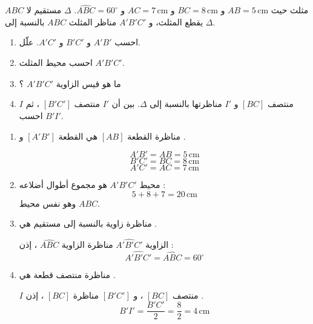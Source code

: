 \documentclass[12pt,a4paper]{article}
\newcommand{\cm}{\,\mathrm{cm}}
\begin{document}
\begin{corr}[title={الحفاظ على الأطوال والزوايا}, stars=2, source={Axiomaths}]
$ABC$ مثلث حيث $AB=5\cm$ و $BC=8\cm$ و $AC=7\cm$ و $\widehat{ABC}=60^\circ$. $\Delta$ مستقيم لا يقطع المثلث، و $A'B'C'$ مناظر المثلث $ABC$ بالنسبة إلى $\Delta$.
\begin{enumerate}
  \item احسب $A'B'$ و $B'C'$ و $A'C'$. علّل.
  \item احسب محيط المثلث $A'B'C'$.
  \item ما هو قيس الزاوية $\widehat{A'B'C'}$ ؟
  \item $I$ منتصف $[BC]$ و $I'$ مناظرتها بالنسبة إلى $\Delta$. بين أن $I'$ منتصف $[B'C']$ ، ثم احسب $B'I'$.
\end{enumerate}
\axsol
\begin{enumerate}[itemsep=14pt]
  \item\leavevmode
  \begin{prop}
  مناظرة القطعة $[AB]$ هي القطعة $[A'B']$ و .
  \end{prop}
  \[A'B'=AB=5\cm\]
  \[B'C'=BC=8\cm\]
  \[A'C'=AC=7\cm\]
  \item محيط $A'B'C'$ هو مجموع أطوال أضلاعه :
  \[5+8+7=20\cm\]
  وهو نفس محيط $ABC$.
  \item\leavevmode
  \begin{prop}
  مناظرة زاوية بالنسبة إلى مستقيم هي .
  \end{prop}
  الزاوية $\widehat{A'B'C'}$ مناظرة الزاوية $\widehat{ABC}$ ، إذن :
  \[\widehat{A'B'C'}=\widehat{ABC}=60^\circ\]
  \item\leavevmode
  \begin{prop}
  مناظرة منتصف قطعة هي .
  \end{prop}
  $I$ منتصف $[BC]$ ، و $[B'C']$ مناظرة $[BC]$ ، إذن .
  \[B'I'=\dfrac{B'C'}{2}=\dfrac{8}{2}=4\cm\]
  \begin{center}
  \end{center}
\end{enumerate}
\end{corr}
\end{document}
